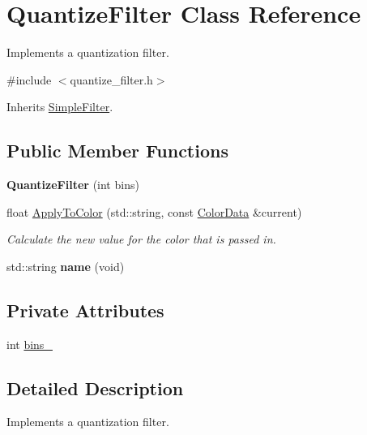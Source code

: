 \hypertarget{classQuantizeFilter}{}\section{Quantize\+Filter Class Reference}
\label{classQuantizeFilter}


Implements a quantization filter.  




{\ttfamily \#include $<$quantize\+\_\+filter.\+h$>$}



Inherits \hyperlink{classSimpleFilter}{Simple\+Filter}.

\subsection*{Public Member Functions}
\begin{DoxyCompactItemize}
\item 
{\bfseries Quantize\+Filter} (int bins)\hypertarget{classQuantizeFilter_a280a83e767ac5d3ca69136242f7219dd}{}\label{classQuantizeFilter_a280a83e767ac5d3ca69136242f7219dd}

\item 
float \hyperlink{classQuantizeFilter_ae76bd6744e50c5cb48a68f93dfb596fc}{Apply\+To\+Color} (std\+::string, const \hyperlink{classimage__tools_1_1ColorData}{Color\+Data} \&current)
\begin{DoxyCompactList}\small\item\em Calculate the new value for the color that is passed in. \end{DoxyCompactList}\item 
std\+::string {\bfseries name} (void)\hypertarget{classQuantizeFilter_a65150819e8a1b50aa1fae29069d0031f}{}\label{classQuantizeFilter_a65150819e8a1b50aa1fae29069d0031f}

\end{DoxyCompactItemize}
\subsection*{Private Attributes}
\begin{DoxyCompactItemize}
\item 
int \hyperlink{classQuantizeFilter_aaa5f146423a5263ec3690098917bd5dc}{bins\+\_\+}
\end{DoxyCompactItemize}


\subsection{Detailed Description}
Implements a quantization filter. 

